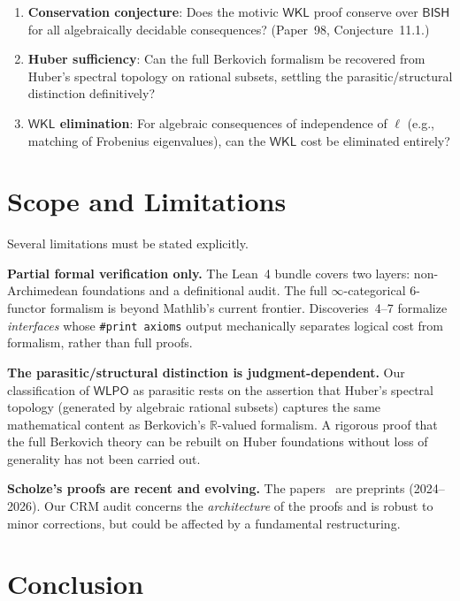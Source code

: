 \documentclass[11pt,a4paper]{article}
\theoremstyle{plain}
\theoremstyle{definition}
\newcommand{\BISH}{\textsf{BISH}}
\newcommand{\WKL}{\textsf{WKL}}
\newcommand{\WLPO}{\textsf{WLPO}}
\newcommand{\R}{\mathbb{R}}
\begin{document}
\begin{enumerate}
\item \textbf{Conservation conjecture}: Does the motivic $\WKL$ proof conserve over $\BISH$ for all algebraically decidable consequences? (Paper~98, Conjecture~11.1.)
\item \textbf{Huber sufficiency}: Can the full Berkovich formalism be recovered from Huber's spectral topology on rational subsets, settling the parasitic/structural distinction definitively?
\item \textbf{$\WKL$ elimination}: For algebraic consequences of independence of $\ell$ (e.g., matching of Frobenius eigenvalues), can the $\WKL$ cost be eliminated entirely?
\end{enumerate}


\section{Scope and Limitations}\label{sec:scope}

Several limitations must be stated explicitly.

\textbf{Partial formal verification only.} The Lean~4 bundle covers two layers: non-Archimedean foundations and a definitional audit. The full $\infty$-categorical 6-functor formalism is beyond Mathlib's current frontier. Discoveries~4--7 formalize \emph{interfaces} whose \texttt{\#print axioms} output mechanically separates logical cost from formalism, rather than full proofs.

\textbf{The parasitic/structural distinction is judgment-dependent.} Our classification of $\WLPO$ as parasitic rests on the assertion that Huber's spectral topology (generated by algebraic rational subsets) captures the same mathematical content as Berkovich's $\R$-valued formalism. A rigorous proof that the full Berkovich theory can be rebuilt on Huber foundations without loss of generality has not been carried out.

\textbf{Scholze's proofs are recent and evolving.} The papers~\cite{scholze-berkovich, scholze-motivic-geometrization} are preprints (2024--2026). Our CRM audit concerns the \emph{architecture} of the proofs and is robust to minor corrections, but could be affected by a fundamental restructuring.


\section{Conclusion}\label{sec:conclusion}
\end{document}
